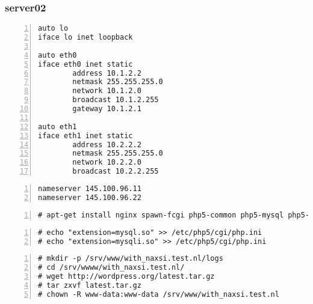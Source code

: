\documentclass[Configuration]{subfiles}
\begin{document}
\subsubsection{server02}


\begin{lstlisting}[frame=single,caption=/etc/network/interfaces,backgroundcolor=\color{gray},breaklines=true,numbers=left,]
auto lo
iface lo inet loopback

auto eth0
iface eth0 inet static
        address 10.1.2.2
        netmask 255.255.255.0
        network 10.1.2.0
        broadcast 10.1.2.255
        gateway 10.1.2.1

auto eth1
iface eth1 inet static
        address 10.2.2.2
        netmask 255.255.255.0
        network 10.2.2.0
        broadcast 10.2.2.255
\end{lstlisting}

\begin{lstlisting}[frame=single,caption=/etc/resolv.conf,backgroundcolor=\color{gray},breaklines=true,numbers=left,]
nameserver 145.100.96.11
nameserver 145.100.96.22
\end{lstlisting}

\begin{lstlisting}[frame=single,caption=necessary packages,backgroundcolor=\color{gray},breaklines=true,numbers=left,]
# apt-get install nginx spawn-fcgi php5-common php5-mysql php5-xmlrpc php5-cgi php5-curl php5-gd php5-cli  php-apc php-pear php5-dev php5-imap php5-mcrypt
\end{lstlisting}

\begin{lstlisting}[frame=single,caption=/etc/php5/cgi/php.ini,backgroundcolor=\color{gray},breaklines=true,numbers=left,]
# echo "extension=mysql.so" >> /etc/php5/cgi/php.ini
# echo "extension=mysqli.so" >> /etc/php5/cgi/php.ini
\end{lstlisting}

\begin{lstlisting}[frame=single,caption=Wordpress 3.5.1 installation,backgroundcolor=\color{gray},breaklines=true,numbers=left,]
# mkdir -p /srv/www/with_naxsi.test.nl/logs
# cd /srv/wwww/with_naxsi.test.nl/
# wget http://wordpress.org/latest.tar.gz
# tar zxvf latest.tar.gz 
# chown -R www-data:www-data /srv/www/with_naxsi.test.nl
\end{lstlisting}
\end{document}
